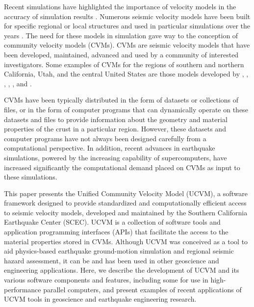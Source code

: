 Recent simulations have highlighted the importance of velocity models in the accuracy of simulation results \citep[e.g.,][]{Taborda_2014_BSSA}. Numerous seismic velocity models have been built for specific regional or local structures and used in particular simulations over the years \citep[e.g.,][]{Frankel_1992_BSSA, Brocher_2008_BSSA, Graves_2008_BSSA}. The need for these models in simulation gave way to the conception of community velocity models (CVMs). CVMs are seismic velocity models that have been developed, maintained, advanced and used by a community of interested investigators. Some examples of CVMs for the regions of southern and northern California, Utah, and the central United States are those models developed by \citet{Kohler_2003_BSSA}, \citet{Suss_2003_JGR}, \citet{Brocher_2006_Proc}, \citet{Magistrale_2006_Tech}, \citet{Plesch_2011_SCEC}, and \citet{RamirezGuzman_2012_BSSA}. 

CVMs have been typically distributed in the form of datasets or collections of files, or in the form of computer programs that can dynamically operate on these datasets and files to provide information about the geometry and material properties of the crust in a particular region. However, these datasets and computer programs have not always been designed carefully from a computational perspective. In addition, recent advances in earthquake simulations, powered by the increasing capability of supercomputers, have increased significantly the computational demand placed on CVMs as input to these simulations. 

This paper presents the Unified Community Velocity Model (UCVM), a software framework designed to provide standardized and computationally efficient access to seismic velocity models, developed and maintained by the Southern California Earthquake Center (SCEC). UCVM is a collection of software tools and application programming interfaces (APIs) that facilitate the access to the material properties stored in CVMs. Although UCVM was conceived as a tool to aid physics-based earthquake ground-motion simulation and regional seismic hazard assessment, it can be and has been used in other geoscience and engineering applications. Here, we describe the development of UCVM and its various software components and features, including some for use in high-performance parallel computers, and present examples of recent applications of UCVM tools in geoscience and earthquake engineering research.

